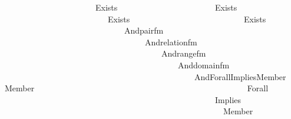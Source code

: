 \begin{isabellebody}
\ \ \ \ \ \ \ \ \ \ \ \ \ \ \ \ \ \ \ \ \ \ Exists\isanewline
\ \ \ \ \ \ \ \ \ \ \ \ \ \ \ \ \ \ \ \ \ \ \ {\isacharparenleft}{\kern0pt}Exists\isanewline
\ \ \ \ \ \ \ \ \ \ \ \ \ \ \ \ \ \ \ \ \ \ \ \ \ {\isacharparenleft}{\kern0pt}Exists\isanewline
\ \ \ \ \ \ \ \ \ \ \ \ \ \ \ \ \ \ \ \ \ \ \ \ \ \ \ {\isacharparenleft}{\kern0pt}Exists\isanewline
\ \ \ \ \ \ \ \ \ \ \ \ \ \ \ \ \ \ \ \ \ \ \ \ \ \ \ \ \ {\isacharparenleft}{\kern0pt}And{\isacharparenleft}{\kern0pt}pair{\isacharunderscore}{\kern0pt}fm{\isacharparenleft}{\kern0pt}{}{\isacharcomma}{\kern0pt}\ {}{\isacharcomma}{\kern0pt}\ {}{\isacharparenright}{\kern0pt}{\isacharcomma}{\kern0pt}\isanewline
\ \ \ \ \ \ \ \ \ \ \ \ \ \ \ \ \ \ \ \ \ \ \ \ \ \ \ \ \ \ \ \ \ \ And{\isacharparenleft}{\kern0pt}relation{\isacharunderscore}{\kern0pt}fm{\isacharparenleft}{\kern0pt}{}{\isacharparenright}{\kern0pt}{\isacharcomma}{\kern0pt}\isanewline
\ \ \ \ \ \ \ \ \ \ \ \ \ \ \ \ \ \ \ \ \ \ \ \ \ \ \ \ \ \ \ \ \ \ \ \ \ \ And{\isacharparenleft}{\kern0pt}range{\isacharunderscore}{\kern0pt}fm{\isacharparenleft}{\kern0pt}{}{\isacharcomma}{\kern0pt}\ {}{\isacharparenright}{\kern0pt}{\isacharcomma}{\kern0pt}\isanewline
\ \ \ \ \ \ \ \ \ \ \ \ \ \ \ \ \ \ \ \ \ \ \ \ \ \ \ \ \ \ \ \ \ \ \ \ \ \ \ \ \ \ And{\isacharparenleft}{\kern0pt}domain{\isacharunderscore}{\kern0pt}fm{\isacharparenleft}{\kern0pt}{}{\isacharcomma}{\kern0pt}\ {}{\isacharparenright}{\kern0pt}{\isacharcomma}{\kern0pt}\isanewline
\ \ \ \ \ \ \ \ \ \ \ \ \ \ \ \ \ \ \ \ \ \ \ \ \ \ \ \ \ \ \ \ \ \ \ \ \ \ \ \ \ \ \ \ \ \ And{\isacharparenleft}{\kern0pt}Forall{\isacharparenleft}{\kern0pt}Implies{\isacharparenleft}{\kern0pt}Member{\isacharparenleft}{\kern0pt}{}{\isacharcomma}{\kern0pt}\ {}{\isacharparenright}{\kern0pt}{\isacharcomma}{\kern0pt}\ Member{\isacharparenleft}{\kern0pt}{}{\isacharcomma}{\kern0pt}\ {}{\isacharparenright}{\kern0pt}{\isacharparenright}{\kern0pt}{\isacharparenright}{\kern0pt}{\isacharcomma}{\kern0pt}\isanewline
\ \ \ \ \ \ \ \ \ \ \ \ \ \ \ \ \ \ \ \ \ \ \ \ \ \ \ \ \ \ \ \ \ \ \ \ \ \ \ \ \ \ \ \ \ \ \ \ \ \ Forall\isanewline
\ \ \ \ \ \ \ \ \ \ \ \ \ \ \ \ \ \ \ \ \ \ \ \ \ \ \ \ \ \ \ \ \ \ \ \ \ \ \ \ \ \ \ \ \ \ \ \ \ \ \ {\isacharparenleft}{\kern0pt}Implies\isanewline
\ \ \ \ \ \ \ \ \ \ \ \ \ \ \ \ \ \ \ \ \ \ \ \ \ \ \ \ \ \ \ \ \ \ \ \ \ \ \ \ \ \ \ \ \ \ \ \ \ \ \ \ \ {\isacharparenleft}{\kern0pt}Member{\isacharparenleft}{\kern0pt}{}{\isacharcomma}{\kern0pt}\ {}{\isacharparenright}{\kern0pt}{\isacharcomma}{\kern0pt}\isanewline

\end{isabellebody}
